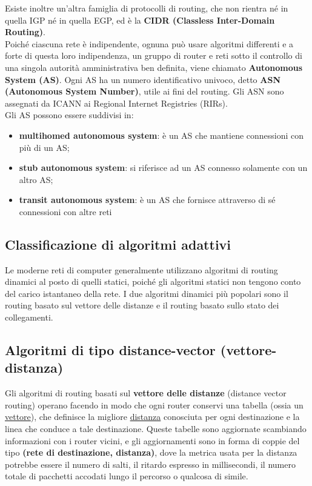             Esiste inoltre un’altra famiglia di protocolli di routing, che non rientra né in quella IGP né in
            quella EGP, ed è la \textbf{CIDR (Classless Inter-Domain Routing)}.\\

            Poiché ciascuna rete è indipendente, ognuna può usare algoritmi differenti e a forte di questa
            loro indipendenza, un gruppo di router e reti sotto il controllo di una singola autorità
            amministrativa ben definita, viene chiamato \textbf{Autonomous System (AS)}. Ogni AS ha un numero
            identificativo univoco, detto \textbf{ASN (Autonomous System Number)}, utile ai fini del routing. Gli
            ASN sono assegnati da ICANN ai Regional Internet Registries (RIRs).\\
            
            Gli AS possono essere suddivisi in:

            \begin{itemize}
                \item \textbf{multihomed autonomous system}: è un AS che mantiene connessioni con più di un AS;
                \item \textbf{stub autonomous system}: si riferisce ad un AS connesso solamente con un altro AS;
                \item \textbf{transit autonomous system}: è un AS che fornisce attraverso di sé connessioni con altre
                reti
            \end{itemize}

        \subsection{Classificazione di algoritmi adattivi}
        Le moderne reti di computer generalmente utilizzano algoritmi di routing dinamici al posto di
        quelli statici, poiché gli algoritmi statici non tengono conto del carico istantaneo della rete.
        I due algoritmi dinamici più popolari sono il routing basato sul vettore delle distanze e il routing
        basato sullo stato dei collegamenti.

        \subsection{Algoritmi di tipo distance-vector (vettore-distanza)}
        Gli algoritmi di routing basati sul \textbf{vettore delle distanze} (distance vector routing) operano
        facendo in modo che ogni router conservi una tabella (ossia un \underline{vettore}), che definisce la
        migliore \underline{distanza} conosciuta per ogni destinazione e la linea che conduce a tale destinazione.
        Queste tabelle sono aggiornate scambiando informazioni con i router vicini, e gli aggiornamenti
        sono in forma di coppie del tipo \textbf{(rete di destinazione, distanza)}, dove la metrica usata per la
        distanza potrebbe essere il numero di salti, il ritardo espresso in millisecondi, il numero totale
        di pacchetti accodati lungo il percorso o qualcosa di simile.

